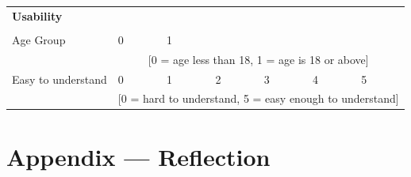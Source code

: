 \documentclass[12pt, titlepage]{article}
\begin{document}
\begin{table}[h]
{\begin{tabular}{|lllllll|}
\multicolumn{7}{|l|}{\textbf{Usability}}  \\
\multicolumn{7}{|l|}{}  
\\ \hline
\multicolumn{1}{|l|}{Age Group}      & \multicolumn{1}{l|}{0} & \multicolumn{1}{l|}{1} & \multicolumn{1}{l}{} & \multicolumn{1}{l}{} & \multicolumn{1}{l}{} &  \\ \hline
\multicolumn{1}{|l|}{}                       & \multicolumn{6}{c|}{{[}0 = age less than 18, 1 = age is 18 or above{]}}                            \\ \hline
\multicolumn{1}{|l|}{Easy to understand}      & \multicolumn{1}{l|}{0} & \multicolumn{1}{l|}{1} & \multicolumn{1}{l|}{2} & \multicolumn{1}{l|}{3} & \multicolumn{1}{l|}{4} & 5 \\ \hline
\multicolumn{1}{|l|}{}                       & \multicolumn{6}{c|}{{[}0 = hard to understand, 5 = easy enough to understand{]}}                            \\ \hline
\end{tabular}}
\end{table}

\newpage{}
\section*{Appendix --- Reflection}
\end{document}
